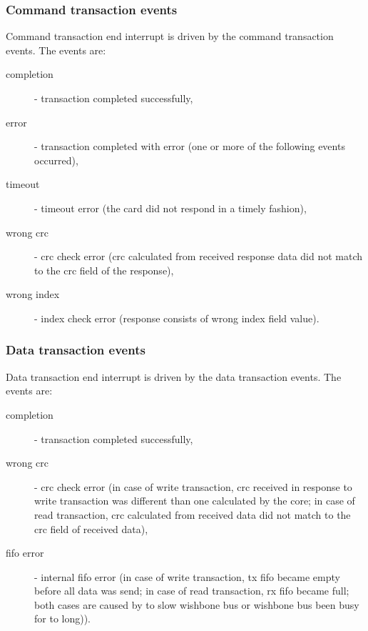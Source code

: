     \subsubsection{Command transaction events}
    \label{sec:cmd_events}

    Command transaction end interrupt is driven by the command transaction events. The events are:
    \begin{description}
    \item[completion] - transaction completed successfully,
    \item[error] - transaction completed with error (one or more of the following events occurred),
    \item[timeout] - timeout error (the card did not respond in a timely fashion),
    \item[wrong crc] - crc check error (crc calculated from received response data did not match to the crc field of the response),
    \item[wrong index] - index check error (response consists of wrong index field value).
    \end{description}
    
    \subsubsection{Data transaction events}
    \label{sec:data_events}

    Data transaction end interrupt is driven by the data transaction events. The events are:
    \begin{description}
    \item[completion] - transaction completed successfully,
    \item[wrong crc] - crc check error (in case of write transaction, crc received in response to write transaction was different than one calculated by the core; 
    in case of read transaction, crc calculated from received data did not match to the crc field of received data),
    \item[fifo error] - internal fifo error (in case of write transaction, tx fifo became empty before all data was send; in case of read transaction, rx fifo became
    full; both cases are caused by to slow wishbone bus or wishbone bus been busy for to long)).
    \end{description}
    

    
